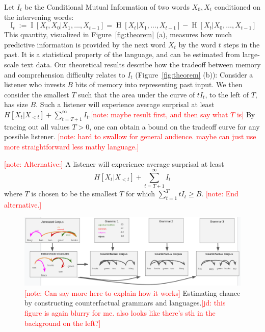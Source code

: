 \documentclass[12pt]{article}
\newcounter{theorem}
\newcommand{\jd}[1]{\textcolor{Red}{[jd: #1]}}
\newcommand{\note}[1]{\textcolor{Red}{[note: #1]}}
\begin{document}
Let $I_t$ be the Conditional Mutual Information of two words $X_0, X_t$ conditioned on the intervening words:
\begin{equation}
	\operatorname{I}_t := \operatorname{I}[X_t, X_0 | X_1, \dots, X_{t-1}] = \operatorname{H}[X_t|X_1, \dots, X_{t-1}] - \operatorname{H}[X_t|X_0, \dots, X_{t-1}] 
\end{equation}
This quantity, visualized in Figure~\ref{fig:theorem} (a), measures how much predictive information is provided by the next word $X_t$ by the word $t$ steps in the past.
It is a statistical property of the language, and can be estimated from large-scale text data.
Our theoretical results describe how the tradeoff between memory and comprehension difficulty relates to $I_t$ (Figure~\ref{fig:theorem} (b)):
Consider a listener who invests $B$ bits of memory into representing past input.
We then consider the smallest $T$ such that the area under the curve of $t I_t$, to the left of $T$, has size $B$.
Such a listener will experience average surprisal at least $H[X_t| X_{<t}] + \sum_{t=T+1}^\infty I_t$.\note{maybe result first, and then say what $T$ is}
By tracing out all values $T >0$, one can obtain a bound on the tradeoff curve for any possible listener.
\note{hard to swallow for general audience. maybe can just use more straightforward less mathy language.}


\note{Alternative:}
A listener will experience average surprisal at least
\begin{equation}
	H[X_t| X_{<t}] + \sum_{t=T+1}^\infty I_t
\end{equation}
where $T$ is chosen to be the smallest $T$ for which $\sum_{t=1}^T t I_t \geq B$.
\note{End alternative.}







\begin{figure}
\centering
\includegraphics[width=\textwidth]{figures-gdrive/counterfactual-languages.png}
	\caption{\note{Can say more here to explain how it works} Estimating chance by constructing counterfactual grammars and languages.\jd{this figure is again blurry for me. also looks like there's sth in the background on the left?}}\label{fig:grammars}
\end{figure}
\end{document}
